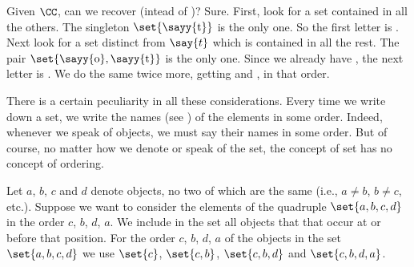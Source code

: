 Given $\CC$, can we recover  (intead of )?
Sure.
First, look for a set contained in all the others.
The singleton $\set{\text{\sayy{t}}}$ is the only one.
So the first letter is .
Next look for a set distinct from $\say{t}$ which is contained in all the rest.
The pair $\set{\text{\sayy{o}}, \text{\sayy{t}}}$ is the only one.
Since we already have , the next letter is .
We do the same twice more, getting  and , in that order.

There is a certain peculiarity in all these considerations.
Every time we write down a set, we write the names (see ) of the elements in some order.
Indeed, whenever we speak of objects, we must say their names in some order.
But of course, no matter how we denote or speak of the set, the concept of set has no concept of ordering.


Let $a$, $b$, $c$ and $d$ denote objects, no two of which are the same (i.e., $a \neq b$, $b \neq c$, etc.).
Suppose we want to consider the elements of the quadruple $\set{a, b, c, d}$ in the order $c$, $b$, $d$, $a$.
We include in the set all objects that that occur at or before that position.
For the order $c$, $b$, $d$, $a$ of the objects in the set $\set{a, b, c, d}$ we use $\set{c}$, $\set{c, b}$, $\set{c, b, d}$ and $\set{c, b, d, a}$.
